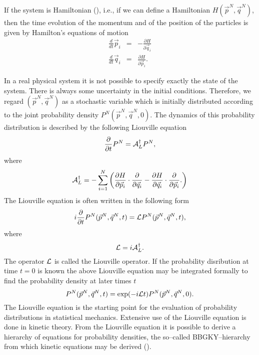 If the system is Hamiltonian (\cite{ARNOLD}), 
i.e., if we can define a Hamiltonian
$H(\vec{p}^N,\vec{q}^N)$, then the time evolution of the momentum 
and of the position of the particles is given by Hamilton's 
equations of motion
\begin{eqnarray*}
\frac{d}{dt} \vec{p}_i &=& - \frac{\partial H}{\partial \vec{q}_i} 
             \\
\frac{d}{dt} \vec{q}_i &=&  \frac{\partial H}{\partial \vec{p}_i} 
.
\end{eqnarray*}

In a real physical system it is not possible to specify exactly 
the state of the system. There is always some uncertainty in the 
initial conditions. Therefore, we regard $(\vec{p}^N,\vec{q}^N)$
as a stochastic variable which is initially distributed according 
to the joint probability density $P^N(\vec{p}^N,\vec{q}^N,0)$. 
The dynamics of this probability distribution
is described by the following 
Liouville equation
\begin{equation*}
\frac{\partial}{\partial t} P^N =  {\cal{A}}_L^{\dagger} P^N,
\end{equation*}
where
\begin{equation*}
{\cal{A}}_L^{\dagger} = -\sum_{i=1}^N \left( 
      \frac{\partial H}{\partial \vec{p}_i} 
            \cdot \frac{\partial}{\partial \vec{q}_i} 
         - \frac{\partial H}{\partial \vec{q}_i} 
             \cdot \frac{\partial}{\partial \vec{p}_i}.
      \right)
\end{equation*}
The Liouville equation is often written in the following form
\begin{equation*}
i \frac{\partial}{\partial t} P^N(\vec{p}^N,\vec{q}^N,t) =  
  {\cal{L}} P^N(\vec{p}^N,\vec{q}^N,t),
\end{equation*}
where
\begin{equation*}
{\cal{L}} =  i {\cal{A}}_L^{\dagger}.
\end{equation*}
The operator ${\cal{L}}$ is called the Liouville operator.
If the probability disribution at time $t=0$ is known the above 
Liouville equation may be integrated formally  
to find the probability density
at later times $t$
\begin{equation*}
P^N(\vec{p}^N,\vec{q}^N,t) = \exp(-i {\cal{L}}t)  
P^N(\vec{p}^N,\vec{q}^N,0).
\end{equation*}
The Liouville equation is the starting point for the evaluation of 
probability distributions in statistical mechanics. Extensive use 
of the Liouville equation is done in kinetic theory. From the 
Liouville equation it is possible to derive a hierarchy of 
equations for probability densities, the so--called 
BBGKY--hierarchy from which kinetic equations may be derived
(\cite{REICHL}).


